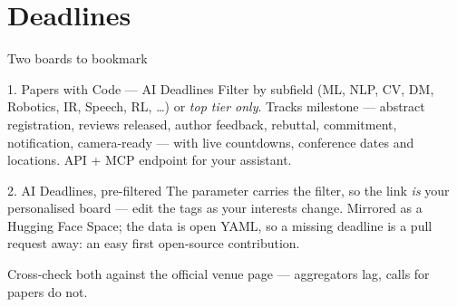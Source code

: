 \documentclass[aspectratio=169,11pt]{beamer}
\begin{document}
\section{Deadlines}

\begin{frame}{Two boards to bookmark}
\begin{block}{1. Papers with Code --- AI Deadlines \quad {}}
\footnotesize
Filter by subfield (ML, NLP, CV, DM, Robotics, IR,
Speech, RL, \ldots) or \emph{top tier only}. Tracks  milestone ---
abstract registration, reviews released, author feedback, rebuttal,
commitment, notification, camera-ready --- with live countdowns, conference
dates and locations. API + MCP endpoint for your assistant.
\end{block}
\begin{block}{2. AI Deadlines, pre-filtered \quad {}}
\footnotesize
The  parameter carries the filter, so the link \emph{is} your
personalised board --- edit the tags as your interests change. Mirrored as a
Hugging Face Space; the data is open YAML, so a missing deadline is a pull
request away: an easy first open-source contribution.
\end{block}
\centering\footnotesize
{} Cross-check both against the official venue page ---
aggregators lag, calls for papers do not.
\end{frame}
\end{document}
